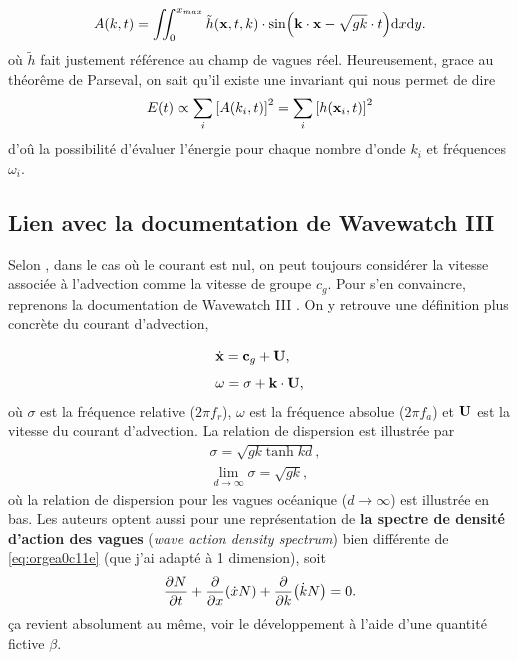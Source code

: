 \documentclass[10pt]{article}
\numberwithin{equation}{section}
\newcommand{\grande}{\vphantom{\frac{1}{xx}}}
\begin{document}
\begin{equation}
   A(k,t) = \iint_0^{x_{max}} \tilde{h}(\vb{x},t,k) \cdot \sin(\vb{k} \cdot \vb{x} - \sqrt{gk}\cdot t) \dd x\dd y.
\end{equation}
où \(\tilde{h}\) fait justement référence au champ de vagues réel. 
Heureusement, grace au théorême de Parseval, on sait qu'il existe une invariant qui nous permet de dire
\begin{equation}
   E(t) \propto \sum_i \qty[A(k_i,t)]^2 = \sum_i \qty[h(\vb{x}_i,t)]^2
\end{equation}
d'oû la possibilité d'évaluer l'énergie pour chaque nombre d'onde \(k_i\) et fréquences \(\omega_i\).
\subsection{Lien avec la documentation de Wavewatch III}
\label{sec:orge687b06}
Selon \Textcite{william2013wave}, dans le cas où le courant est nul, on peut toujours considérer la vitesse associée à l'advection comme la vitesse de groupe \(c_g\).
Pour s'en convaincre, reprenons la documentation de Wavewatch III \autocite[p.11 et 13]{wwiii2016user}.
On y retrouve une définition plus concrète du courant d'advection,
\begin{subequations}
\begin{align}
   & \dot{\vb{x}} = \vb{c}_g + \vb{U},\grande\\
   & \omega = \sigma + \vb{k}\cdot \vb{U},
\end{align}
\end{subequations}
où \(\sigma\) est la fréquence relative (\(2\pi f_r\)), \(\omega\) est la fréquence absolue (\(2\pi f_a\)) et \(\vb{U}\) est la vitesse du courant d'advection. 
La relation de dispersion \autocite[voir][p.11]{wwiii2016user} est illustrée par
\begin{subequations}
\label{eq:org282f871}
\begin{align}
   &\sigma = \sqrt{ gk \tanh kd }, \\
   &\lim_{d\rightarrow\infty} \sigma = \sqrt{gk},
\end{align}
\end{subequations}
où la relation de dispersion pour les vagues océanique (\(d\rightarrow\infty\)) est illustrée en bas.
Les auteurs optent aussi pour une représentation de \textbf{la spectre de densité d'action des vagues} (\emph{wave action density spectrum}) bien différente de \ref{eq:orgea0c11e} (que j'ai adapté à 1 dimension), soit
\begin{equation}
   \pdv{N}{t} + \pdv{}{x}\qty(\dot{x} N) + \pdv{}{k} \qty(\dot{k}N)  = 0.
\end{equation}
ça revient absolument au même, voir le développement à l'aide d'une quantité fictive \(\beta\).\bigskip
\end{document}
